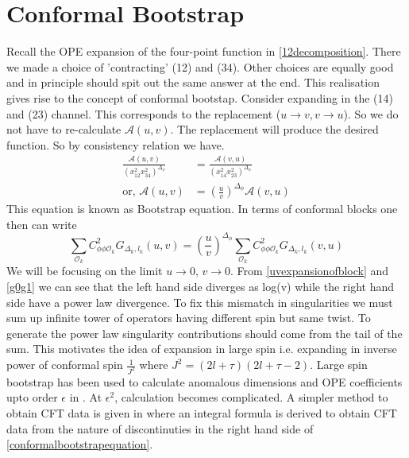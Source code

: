 \documentclass[12pt,a4paper,oneside]{book}
\theoremstyle{definition}
\begin{document}
\section{Conformal Bootstrap}
    Recall the OPE expansion of the four-point function in \ref{12decomposition}. There we made a choice of 'contracting' (12) and (34). Other choices are equally good and in principle should spit out the same answer at the end. This realisation gives rise to the concept of conformal bootstap. Consider expanding in the (14) and (23) channel. This corresponds to the replacement ($u\to v, v\to u$). So we do not have to re-calculate $\mathcal{A}(u,v)$. The replacement will produce the desired function. So by consistency relation we have.
    \begin{align}
        \frac{\mathcal{A}(u,v)}{(x_{12}^2x_{34}^2)^{\Delta_{\phi}}} &= \frac{\mathcal{A}(v,u)}{(x_{14}^2x_{23}^2)^{\Delta_{\phi}}}\nonumber\\
        \text{or, }\mathcal{A}(u,v) &= \left(\frac{u}{v}\right)^{\Delta_{\phi}}\mathcal{A}(v,u)
    \end{align}
    This equation is known as Bootstrap equation. In terms of conformal blocks one then can write
    \begin{equation}\label{conformalbootstrapequation}
        \sum_{\mathcal{O}_k}C_{\phi\phi\mathcal{O}_k}^2G_{\Delta_k,l_k}(u,v) = \left(\frac{u}{v}\right)^{\Delta_{\phi}}\sum_{\mathcal{O}_k}C_{\phi\phi\mathcal{O}_k}^2G_{\Delta_k,l_k}(v,u)
    \end{equation}
    We will be focusing on the limit $u\to0$, $v\to0$. From \ref{uvexpansionofblock} and \ref{g0g1} we can see that the left hand side diverges as log(v) while the right hand side have a power law divergence. To fix this mismatch in singularities we must sum up infinite tower of operators having different spin but same twist. To generate the power law singularity contributions should come from the tail of the sum. This motivates the idea of expansion in large spin i.e. expanding in inverse power of conformal spin $\frac{1}{J^2}$ where $J^2 = (2l+\tau)(2l+\tau-2)$. Large spin bootstrap has been used to calculate anomalous dimensions and OPE coefficients upto order $\epsilon$ in \cite{largespinbootstrap}. At $\epsilon^2$, calculation becomes complicated. A simpler method to obtain CFT data is given in \cite{inversiongravitation}where an integral formula is derived to obtain CFT data from the nature of discontinuties in the right hand side of \ref{conformalbootstrapequation}.
\end{document}
